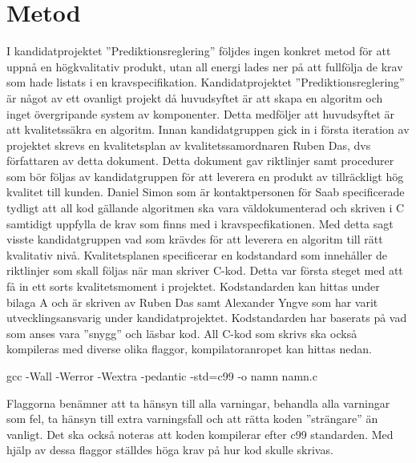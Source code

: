\section{Metod}

I kandidatprojektet ''Prediktionsreglering'' följdes ingen konkret metod för att uppnå en högkvalitativ produkt, utan all energi lades ner på att fullfölja de krav som hade listats i en kravspecifikation.
\newline
\newline
Kandidatprojektet ''Prediktionsreglering'' är något av ett ovanligt projekt då huvudsyftet är att skapa en algoritm och inget övergripande system av komponenter. Detta medföljer att huvudsyftet är att kvalitetssäkra en algoritm.
\newline
\newline
Innan kandidatgruppen gick in i första iteration av projektet skrevs en kvalitetsplan av kvalitetssamordnaren Ruben Das, dvs författaren av detta dokument. Detta dokument gav riktlinjer samt procedurer som bör följas av kandidatgruppen för att leverera en produkt av tillräckligt hög kvalitet till kunden. Daniel Simon som är kontaktpersonen för Saab specificerade tydligt att all kod gällande algoritmen ska vara väldokumenterad och skriven i C samtidigt uppfylla de krav som finns med i kravspecfikationen. Med detta sagt visste kandidatgruppen vad som krävdes för att leverera en algoritm till rätt kvalitativ nivå. Kvalitetsplanen specificerar en kodstandard som innehåller de riktlinjer som skall följas när man skriver C-kod. Detta var första steget med att få in ett sorts kvalitetsmoment i projektet. Kodstandarden kan hittas under bilaga A och är skriven av Ruben Das samt Alexander Yngve som har varit utvecklingsansvarig under kandidatprojektet. Kodstandarden har baserats på vad som anses vara ''snygg'' och läsbar kod. All C-kod som skrivs ska också kompileras med diverse olika flaggor, kompilatoranropet kan hittas nedan.
\begin{tcolorbox}[boxrule=1pt,leftrule=5pt,arc=0pt,auto outer arc]
gcc -Wall -Werror -Wextra -pedantic -std=c99 -o namn namn.c
\end{tcolorbox}
\noindent Flaggorna benämner att ta hänsyn till alla varningar, behandla alla varningar som fel, ta hänsyn till extra varningsfall och att rätta koden ''strängare'' än vanligt. Det ska också noteras att koden kompilerar efter c99 standarden. Med hjälp av dessa flaggor ställdes höga krav på hur kod skulle skrivas.
\newline
\newline
